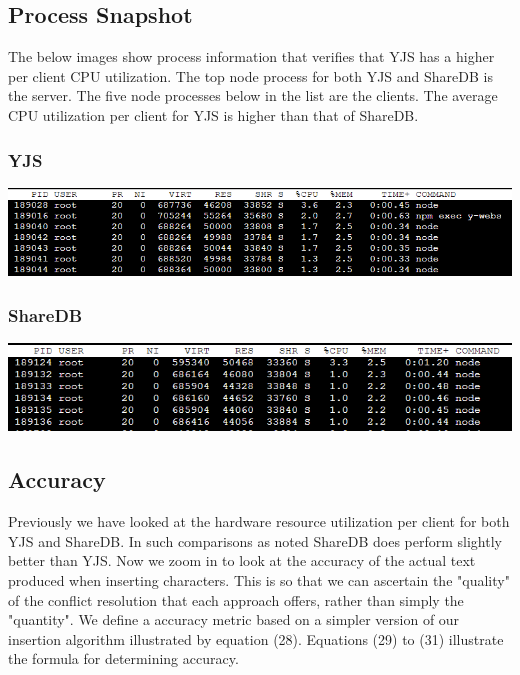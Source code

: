 \documentclass[9pt, titlepage]{article}
\begin{document}
  \subsection{Process Snapshot}
  The below images show process information that verifies that YJS has a higher per client CPU utilization.
  The top node process for both YJS and ShareDB is the server. The five node processes below in the list are the clients.
  The average CPU utilization per client for YJS is higher than that of ShareDB.
  
  \subsubsection{YJS}
  \begin{center}
    \includegraphics[scale=0.60]{yjs_processes.png}
  \end{center}

  \subsubsection{ShareDB}
  \begin{center}
    \includegraphics[scale=0.60]{sharedb_processes.PNG}
  \end{center}

  \subsection{Accuracy}
  Previously we have looked at the hardware resource utilization per client for both YJS and ShareDB. In such comparisons as noted ShareDB does
  perform slightly better than YJS. Now we zoom in to look at the accuracy of the actual text produced when inserting characters.
  This is so that we can ascertain the "quality" of the conflict resolution that each approach offers, rather than simply the "quantity".
  We define a accuracy metric based on a simpler version of our insertion algorithm illustrated by equation (28). Equations (29) to (31)
  illustrate the formula for determining accuracy.
\end{document}
